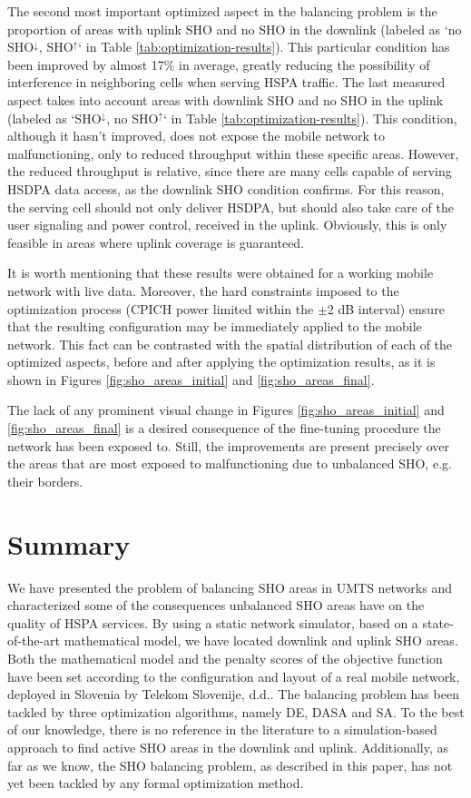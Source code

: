 The second most important optimized aspect in the balancing problem
is the proportion of areas with uplink SHO and no SHO in the downlink
(labeled as \textquoteleft{}no SHO$^{\downarrow}$, SHO$^{\uparrow}$\textquoteleft{}
in Table \ref{tab:optimization-results}). This particular condition
has been improved by almost 17\% in average, greatly reducing the
possibility of interference in neighboring cells when serving HSPA
traffic. The last measured aspect takes into account areas with downlink
SHO and no SHO in the uplink (labeled as \textquoteleft{}SHO$^{\downarrow}$,
no SHO$^{\uparrow}$\textquoteleft{} in Table \ref{tab:optimization-results}).
This condition, although it hasn't improved, does not expose the mobile
network to malfunctioning, only to reduced throughput within these
specific areas. However, the reduced throughput is relative, since
there are many cells capable of serving HSDPA data access, as the
downlink SHO condition confirms. For this reason, the serving cell
should not only deliver HSDPA, but should also take care of the user
signaling and power control, received in the uplink. Obviously, this
is only feasible in areas where uplink coverage is guaranteed.

It is worth mentioning that these results were obtained for a working
mobile network with live data. Moreover, the hard constraints imposed
to the optimization process (CPICH power limited within the $\pm$2
dB interval) ensure that the resulting configuration may be immediately
applied to the mobile network. This fact can be contrasted with the
spatial distribution of each of the optimized aspects, before and
after applying the optimization results, as it is shown in Figures
\ref{fig:sho_areas_initial} and \ref{fig:sho_areas_final}.

The lack of any prominent visual change in Figures \ref{fig:sho_areas_initial}
and \ref{fig:sho_areas_final} is a desired consequence of the fine-tuning
procedure the network has been exposed to. Still, the improvements
are present precisely over the areas that are most exposed to malfunctioning
due to unbalanced SHO, e.g. their borders.


\section{Summary \label{sec:Conclusion}}

We have presented the problem of balancing SHO areas in UMTS networks
and characterized some of the consequences unbalanced SHO areas have
on the quality of HSPA services. By using a static network simulator,
based on a state-of-the-art mathematical model, we have located downlink
and uplink SHO areas. Both the mathematical model and the penalty
scores of the objective function have been set according to the configuration
and layout of a real mobile network, deployed in Slovenia by Telekom
Slovenije, d.d.. The balancing problem has been tackled by three optimization
algorithms, namely DE, DASA and SA. To the best of our knowledge,
there is no reference in the literature to a simulation-based approach
to find active SHO areas in the downlink and uplink. Additionally,
as far as we know, the SHO balancing problem, as described in this
paper, has not yet been tackled by any formal optimization method.

